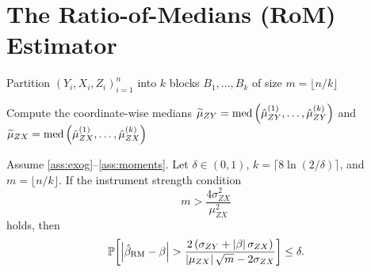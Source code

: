 \section{The Ratio-of-Medians (RoM) Estimator}
\label{sec:rom}

\begin{algorithm}[H]
\label{alg:rom}
\caption{Ratio-of-Medians Estimator}

Partition $(Y_i,X_i,Z_i)_{i=1}^{n}$ into $k$ blocks $B_1, \dots, B_k$ of size $m = \lfloor n/k \rfloor$\;


Compute the coordinate-wise medians $\widetilde{\mu}_{ZY} = \operatorname{med}\left(\hat{\mu}_{ZY}^{(1)}, \dots, \hat{\mu}_{ZY}^{(k)}\right)$ and $\widetilde{\mu}_{ZX} = \operatorname{med}\left(\hat{\mu}_{ZX}^{(1)}, \dots, \hat{\mu}_{ZX}^{(k)}\right)$\;

\end{algorithm}

\begin{theorem}
\label{thm:rom}
Assume \ref{ass:exog}--\ref{ass:moments}. Let $\delta \in (0,1)$, $k = \lceil 8\ln(2/\delta) \rceil$, and $m = \lfloor n/k \rfloor$. If the instrument strength condition
\begin{equation}
\label{eq:rom_strength}
    m > \frac{4\sigma_{ZX}^2}{\mu_{ZX}^2}
\end{equation}
holds, then
\begin{equation}
\label{eq:rom_bound}
    \operatorname{\mathbb{P}}\!\left[\left|\hat{\beta}_{\mathrm{RM}} - \beta\right| > \frac{2\left(\sigma_{ZY} + \left|\beta\right|\sigma_{ZX}\right)}{\left|\mu_{ZX}\right|\sqrt{m} - 2\sigma_{ZX}}\right] \leq \delta.
\end{equation}
\end{theorem}

